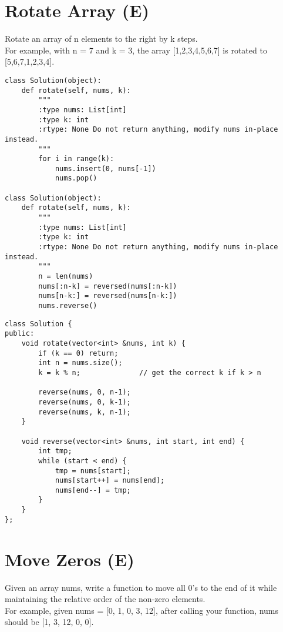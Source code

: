 \section{Rotate Array (E)}
Rotate an array of n elements to the right by k steps.\\

For example, with n = 7 and k = 3, the array [1,2,3,4,5,6,7] is rotated to [5,6,7,1,2,3,4]. \\

\begin{lstlisting}
class Solution(object):
    def rotate(self, nums, k):
        """
        :type nums: List[int]
        :type k: int
        :rtype: None Do not return anything, modify nums in-place instead.
        """
        for i in range(k):
            nums.insert(0, nums[-1])
            nums.pop()
            
class Solution(object):
    def rotate(self, nums, k):
        """
        :type nums: List[int]
        :type k: int
        :rtype: None Do not return anything, modify nums in-place instead.
        """
        n = len(nums)
        nums[:n-k] = reversed(nums[:n-k])
        nums[n-k:] = reversed(nums[n-k:])
        nums.reverse()
\end{lstlisting}
        
\begin{lstlisting}
class Solution {
public:
    void rotate(vector<int> &nums, int k) {
        if (k == 0) return;
        int n = nums.size();
        k = k % n;              // get the correct k if k > n
        
        reverse(nums, 0, n-1);
        reverse(nums, 0, k-1);
        reverse(nums, k, n-1);
    }
    
    void reverse(vector<int> &nums, int start, int end) {
        int tmp; 
        while (start < end) {
            tmp = nums[start];
            nums[start++] = nums[end];
            nums[end--] = tmp;
        }
    }
};
\end{lstlisting}


\section{Move Zeros (E)}
Given an array nums, write a function to move all 0's to the end of it while maintaining the relative order of the non-zero elements.\\

For example, given nums = [0, 1, 0, 3, 12], after calling your function, nums should be [1, 3, 12, 0, 0].\\

